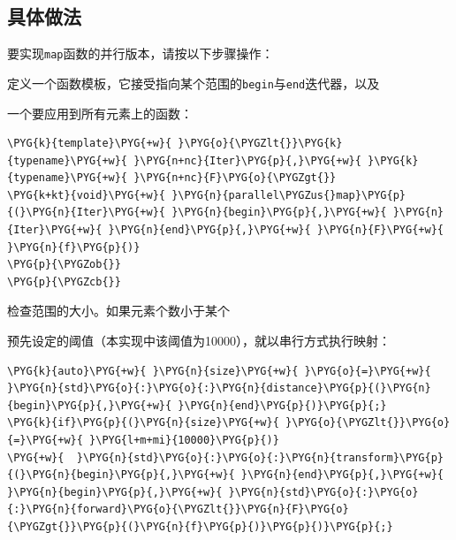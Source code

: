 
\subsection{具体做法}



要实现\texttt{map}函数的并行版本，请按以下步骤操作：



定义一个函数模板，它接受指向某个范围的\texttt{begin}与\texttt{end}迭代器，以及



一个要应用到所有元素上的函数：



\begin{codeblockbg}
\begin{Verbatim}[commandchars=\\\{\},breaklines=true,breakanywhere=true,fontsize=\codefont,xleftmargin=17bp]
\PYG{k}{template}\PYG{+w}{ }\PYG{o}{\PYGZlt{}}\PYG{k}{typename}\PYG{+w}{ }\PYG{n+nc}{Iter}\PYG{p}{,}\PYG{+w}{ }\PYG{k}{typename}\PYG{+w}{ }\PYG{n+nc}{F}\PYG{o}{\PYGZgt{}}
\PYG{k+kt}{void}\PYG{+w}{ }\PYG{n}{parallel\PYGZus{}map}\PYG{p}{(}\PYG{n}{Iter}\PYG{+w}{ }\PYG{n}{begin}\PYG{p}{,}\PYG{+w}{ }\PYG{n}{Iter}\PYG{+w}{ }\PYG{n}{end}\PYG{p}{,}\PYG{+w}{ }\PYG{n}{F}\PYG{+w}{ }\PYG{n}{f}\PYG{p}{)}
\PYG{p}{\PYGZob{}}
\PYG{p}{\PYGZcb{}}
\end{Verbatim}
\end{codeblockbg}



检查范围的大小。如果元素个数小于某个



预先设定的阈值（本实现中该阈值为10000），就以串行方式执行映射：



\begin{codeblockbg}
\begin{Verbatim}[commandchars=\\\{\},breaklines=true,breakanywhere=true,fontsize=\codefont,xleftmargin=17bp]
\PYG{k}{auto}\PYG{+w}{ }\PYG{n}{size}\PYG{+w}{ }\PYG{o}{=}\PYG{+w}{ }\PYG{n}{std}\PYG{o}{:}\PYG{o}{:}\PYG{n}{distance}\PYG{p}{(}\PYG{n}{begin}\PYG{p}{,}\PYG{+w}{ }\PYG{n}{end}\PYG{p}{)}\PYG{p}{;}
\PYG{k}{if}\PYG{p}{(}\PYG{n}{size}\PYG{+w}{ }\PYG{o}{\PYGZlt{}}\PYG{o}{=}\PYG{+w}{ }\PYG{l+m+mi}{10000}\PYG{p}{)}
\PYG{+w}{  }\PYG{n}{std}\PYG{o}{:}\PYG{o}{:}\PYG{n}{transform}\PYG{p}{(}\PYG{n}{begin}\PYG{p}{,}\PYG{+w}{ }\PYG{n}{end}\PYG{p}{,}\PYG{+w}{ }\PYG{n}{begin}\PYG{p}{,}\PYG{+w}{ }\PYG{n}{std}\PYG{o}{:}\PYG{o}{:}\PYG{n}{forward}\PYG{o}{\PYGZlt{}}\PYG{n}{F}\PYG{o}{\PYGZgt{}}\PYG{p}{(}\PYG{n}{f}\PYG{p}{)}\PYG{p}{)}\PYG{p}{;}
\end{Verbatim}
\end{codeblockbg}


